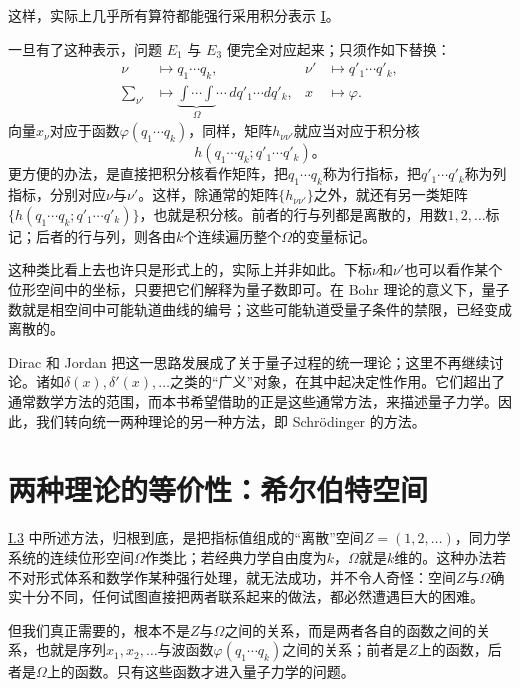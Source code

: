 \documentclass[fontsize=13pt,twoside,openany,headings=normal,parskip=false,bookmarkpackage=false,DIV=calc]{scrbook}
\begin{document}
\hypertarget{origpage-15}{}\label{origpage-15}这样，实际上几乎所有算符都能强行采用积分表示 \hyperref[eq:I.3.I]{I}。

一旦有了这种表示，问题 \hyperref[eq:I.3.E1]{$E_1$} 与 \hyperref[eq:I.3.E3]{$E_3$} 便完全对应起来；只须作如下替换：
\begin{align*}
 \nu&\mapsto q_1\cdots q_k,& \nu'&\mapsto q'_1\cdots q'_k,\\
 \sum_{\nu'}&\mapsto\underbrace{\int\cdots\int}_{\Omega}\cdots\,dq'_1\cdots dq'_k,& x&\mapsto\varphi.
\end{align*}
向量$x_\nu$对应于函数$\varphi(q_1\cdots q_k)$，同样，矩阵$h_{\nu\nu'}$就应当对应于积分核
\[
h(q_1\cdots q_k;q'_1\cdots q'_k)\text{。}
\]
更方便的办法，是直接把积分核看作矩阵，把$q_1\cdots q_k$称为行指标，把$q'_1\cdots q'_k$称为列指标，分别对应$\nu$与$\nu'$。这样，除通常的矩阵$\{h_{\nu\nu'}\}$之外，就还有另一类矩阵$\{h(q_1\cdots q_k;q'_1\cdots q'_k)\}$，也就是积分核。前者的行与列都是离散的，用数$1,\allowbreak 2,\allowbreak \ldots$标记；后者的行与列，则各由$k$个连续遍历整个$\Omega$的变量标记。

这种类比看上去也许只是形式上的，实际上并非如此。下标$\nu$和$\nu'$也可以看作某个位形空间中的坐标，只要把它们解释为量子数即可。在 Bohr 理论的意义下，量子数就是相空间中可能轨道曲线的编号；这些可能轨道受量子条件的禁限，已经变成离散的。

Dirac 和 Jordan 把这一思路发展成了关于量子过程的统一理论；这里不再继续讨论。诸如$\delta(x),\allowbreak \delta'(x),\allowbreak \ldots$之类的“广义”对象，在其中起决定性作用。它们超出了通常数学方法的范围，而本书希望借助的正是这些通常方法，来描述量子力学。因此，我们转向统一两种理论的另一种方法，即 Schrödinger 的方法。

\section{两种理论的等价性：希尔伯特空间}\label{sec:I.4}
\hyperref[sec:I.3]{I.3} 中所述方法，归根到底，是把指标值组成的“离散”空间$Z=(1,\allowbreak 2,\allowbreak \ldots)$，同力学系统的连续位形空间$\Omega$作类比；若经典力学自由度为$k$，$\Omega$就是$k$维的。这种办法若不对形式体系和数学作某种强行处理，就无法成功，并不令人奇怪：空间$Z$与$\Omega$确实十分不同，任何试图直接把两者联系起来的做法，都必然遭遇巨大的困难。

但我们真正需要的，根本不是$Z$与$\Omega$之间的关系，而是两者各自的\hypertarget{origpage-16}{}\label{origpage-16}函数之间的关系，也就是序列$x_1,\allowbreak x_2,\allowbreak \ldots$与波函数$\varphi(q_1\cdots q_k)$之间的关系；前者是$Z$上的函数，后者是$\Omega$上的函数。只有这些函数才进入量子力学的问题。
\end{document}
